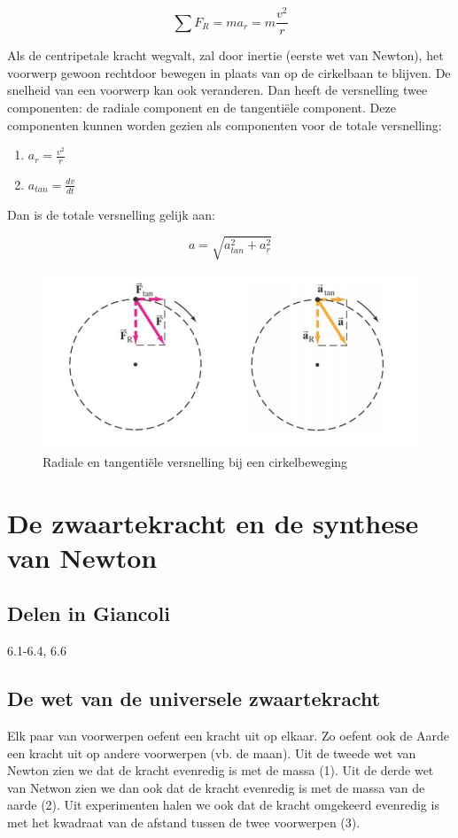 \documentclass[12pt,a4paper]{article}
\begin{document}
    $$ \sum F_{R} = ma_{r} = m\frac{v^{2}}{r} $$ 
    
    Als de centripetale kracht wegvalt, zal door inertie (eerste wet van Newton), het voorwerp gewoon rechtdoor bewegen in plaats van op de cirkelbaan te blijven. 
    De snelheid van een voorwerp kan ook veranderen. Dan heeft de versnelling twee componenten: de radiale component en de tangentiële component. Deze componenten
    kunnen worden gezien als componenten voor de totale versnelling:
    
    \begin{enumerate}
    	\item $a_{r} = \frac{v^{2}}{r}$
    	\item $a_{tan} = \frac{dv}{dt}$
    \end{enumerate}
    
    Dan is de totale versnelling gelijk aan:
    
    $$ a = \sqrt{a_{tan}^{2} + a_{r}^{2}} $$ 
    
    \begin{figure}[h]
    	\centering
	\includegraphics[width=0.6\linewidth]{cirkel_versnelling}
    	\caption{Radiale en tangentiële versnelling bij een cirkelbeweging}
        	\label{cirkel_versnelling}
    \end{figure}

    \section{De zwaartekracht en de synthese van Newton}

    \subsection{Delen in Giancoli}
    6.1-6.4, 6.6

    \subsection{De wet van de universele zwaartekracht}
    Elk paar van voorwerpen oefent een kracht uit op elkaar. Zo oefent ook de Aarde een kracht uit op andere voorwerpen (vb. de maan). 
    Uit de tweede wet van Newton zien we dat de kracht evenredig is met de massa (1). Uit de derde wet van Netwon
    zien we dan ook dat de kracht evenredig is met de massa van de aarde (2). Uit experimenten halen we ook dat de kracht
    omgekeerd evenredig is met het kwadraat van de afstand tussen de twee voorwerpen (3). 
    
\end{document}
